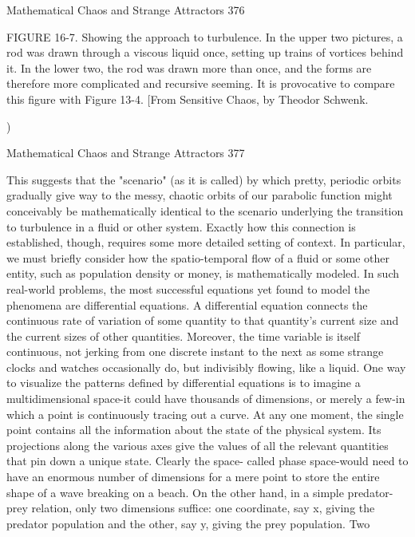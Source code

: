 Mathematical Chaos and Strange Attractors                                             376

FIGURE 16-7. Showing the approach to turbulence. In the upper two pictures, a rod
was drawn through a viscous liquid once, setting up trains of vortices behind it. In the
lower two, the rod was drawn more than once, and the forms are therefore more
complicated and recursive seeming. It is provocative to compare this figure with
Figure 13-4. [From Sensitive Chaos, by Theodor Schwenk.




       )


Mathematical Chaos and Strange Attractors                                           377

This suggests that the "scenario" (as it is called) by which pretty, periodic orbits
gradually give way to the messy, chaotic orbits of our parabolic function might
conceivably be mathematically identical to the scenario underlying the transition to
turbulence in a fluid or other system. Exactly how this connection is established,
though, requires some more detailed setting of context. In particular, we must briefly
consider how the spatio-temporal flow of a fluid or some other entity, such as
population density or money, is mathematically modeled.
        In such real-world problems, the most successful equations yet found to model
the phenomena are differential equations. A differential equation connects the
continuous rate of variation of some quantity to that quantity's current size and the
current sizes of other quantities. Moreover, the time variable is itself continuous, not
jerking from one discrete instant to the next as some strange clocks and watches
occasionally do, but indivisibly flowing, like a liquid. One way to visualize the
patterns defined by differential equations is to imagine a multidimensional space-it
could have thousands of dimensions, or merely a few-in which a point is continuously
tracing out a curve. At any one moment, the single point contains all the information
about the state of the physical system. Its projections along the various axes give the
values of all the relevant quantities that pin down a unique state. Clearly the space-
called phase space-would need to have an enormous number of dimensions for a mere
point to store the entire shape of a wave breaking on a beach. On the other hand, in a
simple predator-prey relation, only two dimensions suffice: one coordinate, say x,
giving the predator population and the other, say y, giving the prey population. Two
